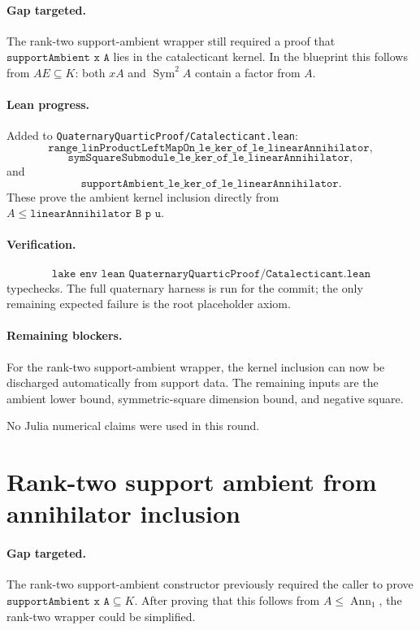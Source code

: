 \documentclass[11pt]{article}
\begin{document}
\paragraph{Gap targeted.}
The rank-two support-ambient wrapper still required a proof that
\(\texttt{supportAmbient x A}\) lies in the catalecticant kernel.  In the
blueprint this follows from \(AE\subseteq K\): both \(xA\) and
\(\operatorname{Sym}^2A\) contain a factor from \(A\).

\paragraph{Lean progress.}
Added to \texttt{QuaternaryQuarticProof/Catalecticant.lean}:
\[
\texttt{range\_linProductLeftMapOn\_le\_ker\_of\_le\_linearAnnihilator},
\]
\[
\texttt{symSquareSubmodule\_le\_ker\_of\_le\_linearAnnihilator},
\]
and
\[
\texttt{supportAmbient\_le\_ker\_of\_le\_linearAnnihilator}.
\]
These prove the ambient kernel inclusion directly from
\(A\le\texttt{linearAnnihilator B p u}\).

\paragraph{Verification.}
\[
\texttt{lake env lean QuaternaryQuarticProof/Catalecticant.lean}
\]
typechecks.  The full quaternary harness is run for the commit; the only
remaining expected failure is the root placeholder axiom.

\paragraph{Remaining blockers.}
For the rank-two support-ambient wrapper, the kernel inclusion can now be
discharged automatically from support data.  The remaining inputs are the
ambient lower bound, symmetric-square dimension bound, and negative square.

No Julia numerical claims were used in this round.

\section*{Rank-two support ambient from annihilator inclusion}

\paragraph{Gap targeted.}
The rank-two support-ambient constructor previously required the caller to
prove \(\texttt{supportAmbient x A}\subseteq K\).  After proving that this
follows from \(A\le\operatorname{Ann}_1\), the rank-two wrapper could be
simplified.
\end{document}
